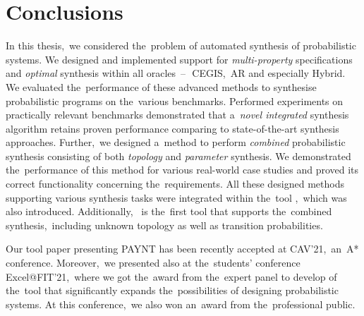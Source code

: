 \section{Conclusions}
In this thesis,~we considered the~problem of automated synthesis of probabilistic systems.
We designed and implemented support for \emph{multi-property} specifications and \emph{optimal} synthesis within all oracles \,--\,~CEGIS,~AR and especially Hybrid.
We evaluated the~performance of these advanced methods to synthesise probabilistic programs on the~various benchmarks.
Performed experiments on practically relevant benchmarks demonstrated that a~\textit{novel integrated} synthesis algorithm retains proven performance comparing to state-of-the-art synthesis approaches.
Further,~we designed a~method to perform \emph{combined} probabilistic synthesis consisting of both \emph{topology} and \emph{parameter} synthesis.
We demonstrated the~performance of this method for various real-world case studies and proved its correct functionality concerning the~requirements.
All these designed methods supporting various synthesis tasks were integrated within the~tool \toolname{},~which was also introduced.
Additionally,~\toolname{} is the~first tool that supports the~combined synthesis,~including unknown topology as well as transition probabilities.

Our tool paper presenting PAYNT has been recently accepted at CAV'21,~an~A* conference.
Moreover,~we presented \toolname{} also at the~students' conference Excel@FIT'21,~where we got the~award from the~expert panel to develop of the~tool that significantly expands the~possibilities of designing probabilistic systems.
At this conference,~we also won an~award from the~professional public.
